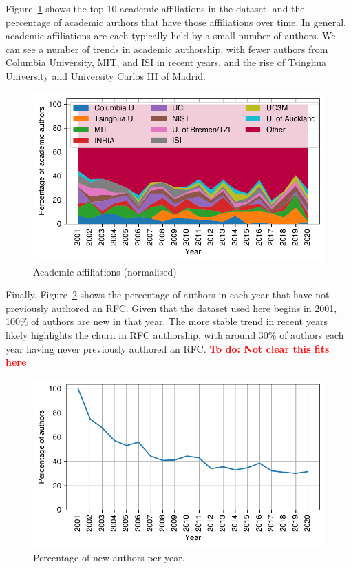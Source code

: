 \documentclass[twocolumn,10pt]{article}
\newlength{\figureWidthOneColumn}
\newcommand{\todo}[1]{\textbf{\textcolor{red}{To do: #1}}}
\newcommand{\pb}[1]{\vspace{0.75ex}\noindent{\textbf{#1}}}
\begin{document}
Figure~\ref{fig:author_affiliations_normalised_acad} shows the top 10
academic affiliations in the dataset, and the percentage of academic
authors that have those affiliations over time. In general, academic
affiliations are each typically held by a small number of authors. We can
see a number of trends in academic authorship, with fewer authors from
Columbia University, MIT, and ISI in recent years, and the rise of Tsinghua
University and University Carlos III of Madrid.

\begin{figure}
  \centering
  \includegraphics[width=\figureWidthOneColumn]{figures-prev/imc-2021/authors/top5_affiliations_normalised_acad.pdf}
  \caption{
    Academic affiliations (normalised)
  }
  \label{fig:author_affiliations_normalised_acad}
\end{figure}

\pb{Arrival of new authors:}
Finally, Figure~\ref{fig:author_new} shows the percentage of authors in each
year that have not previously authored an RFC. Given that the dataset used here
begins in 2001, 100\% of authors are new in that year. The more stable trend in
recent years likely highlights the churn in RFC authorship, with around 30\%
of authors each year having never previously authored an RFC.
\todo{Not clear this fits here}

\begin{figure}
  \centering
  \includegraphics[width=\figureWidthOneColumn]{figures-prev/imc-2021/authors/repeat_authors.pdf}
  \caption{
    Percentage of new authors per year.
  }
  \label{fig:author_new}
\end{figure}
\end{document}

